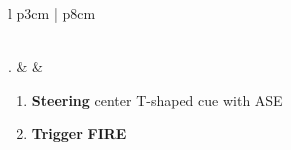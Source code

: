 \documentclass[8pt,usenames,dvipsnames,twoside]{article}
\begin{document}
\begin{center}
\begin{tabular}{l p{3cm} | p{8cm}}
\begin{minipage}[t]{\linewidth}
\begin{enumerate}[label=(\alph*)]
					\end{enumerate}
				\end{minipage} \\
				. &  & 
				\begin{minipage}[t]{\linewidth}
					\vspace{-7pt}
					\begin{enumerate}[label=(\alph*)]
						\item \textbf{Steering} \dotfill center T-shaped cue with ASE
						\item \textbf{Trigger} \dotfill \textbf{FIRE}
					\end{enumerate}
				\end{minipage} \\
				\bottomrule
			\end{tabular}
		\end{center}
		
\end{document}
